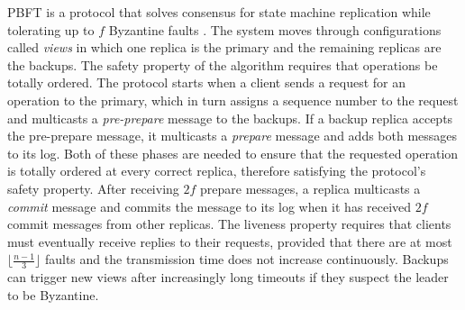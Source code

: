 \iffalse One potentially dangerous scenario occurs when the leader is faulty. In this case, the leader could split the acceptors votes or run a fast ballot in some and a classic ballot in others. In this scenario, since learners require $N-f$ votes for any given sequence and non-commutative sequences aren't considered equivalent, at most one sequence can be learned by correct learners. This also applies to the case where two non-commutative sequences are proposed in a fast ballot. It's possible for the votes to be split in a way such that no sequence is learned. In this case, for the remainder of the ballot, since every possible subsequent sequence at each acceptor will be an extension of the previous non-commutative sequences, no new sequences will be learned. This prevents safety from being violated but also precludes liveness until a new classic ballot is initiated by a correct leader. Once a correct leader gathers the previous votes from the acceptors, it will propose a serialization of previous sequences that solves the conflict caused by the non-commutative sequences.
\fi
\par
PBFT is a protocol that solves consensus for state machine replication while tolerating up to $f$ Byzantine faults \cite{CL99}. The system moves through configurations called \textit{views} in which one replica is the primary and the remaining replicas are the backups. The safety property of the algorithm requires that operations be totally ordered. The protocol starts when a client sends a request for an operation to the primary, which in turn assigns a sequence number to the request and multicasts a \textit{pre-prepare} message to the backups. If a backup replica accepts the pre-prepare message, it multicasts a \textit{prepare} message and adds both messages to its log. Both of these phases are needed to ensure that the requested operation is totally ordered at every correct replica, therefore satisfying the protocol's safety property. After receiving $2f$ prepare messages, a replica multicasts a \textit{commit} message and commits the message to its log when it has received $2f$ commit messages from other replicas. The liveness property requires that clients must eventually receive replies to their requests, provided that there are at most $\lfloor\frac{n-1}{3}\rfloor$ faults and the transmission time does not increase continuously. Backups can trigger new views after increasingly long timeouts if they suspect the leader to be Byzantine. \par